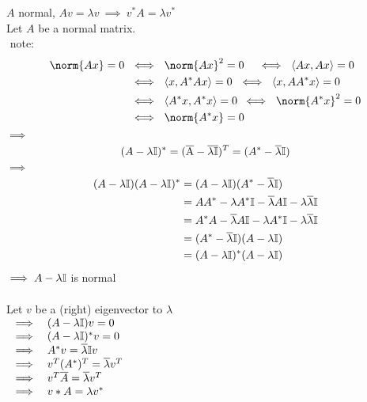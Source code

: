 \begin{SolutionSheet}[\ref{sheet2}]
\begin{onehalfspace}
  \begin{Solution}
    \Claim $A$ normal, $Av = \lambda v \ 
      \implies \ v^* A = \lambda v^*$ \\
    \Proof Let $A$ be a normal matrix. \\
    $ $ note: \begin{equation*}
      \begin{split}
        \norm{Ax} = 0 \ &\iff \ \norm{Ax}^2 = 0 \quad 
          \iff \ \langle Ax,Ax \rangle = 0 \\
          &\iff \ \langle x, A^*Ax \rangle = 0 \ 
          \iff \ \langle x, AA^*x \rangle = 0 \\
          &\iff \  \langle A^*x,A^*x\rangle = 0 \: 
          \iff \ \norm{A^*x}^2 = 0 \\
          &\iff \ \norm{A^*x} = 0
      \end{split}
    \end{equation*}
    $\implies$ \begin{equation*}
      (A - \lambda \mathbb{I})^* 
        = (\overline{\rm A} - \overline{\rm \lambda \mathbb{I}})^T 
        = (A^* - \overline{\lambda} \mathbb{I}) 
    \end{equation*}
    $ \implies$ \begin{align*} 
      (A - \lambda \mathbb{I})(A - \lambda \mathbb{I})^* &= (A - \lambda \mathbb{I})(A^* - \overline{\lambda} \mathbb{I}) \\
      &= AA^* - \lambda A^*\mathbb{I} - \overline{\lambda} A \mathbb{I} - \lambda \overline{\lambda} \mathbb{I} \\
      &= A^*A - \overline{\lambda} A \mathbb{I} - \lambda A^*\mathbb{I} - \lambda \overline{\lambda} \mathbb{I} \\
      &= (A^* - \overline{\lambda} \mathbb{I})(A - \lambda \mathbb{I}) \\
      &= (A - \lambda \mathbb{I})^* (A - \lambda \mathbb{I})
    \end{align*}
    $ \implies A - \lambda \mathbb{I}$ is normal\\
    \\
    Let $v$ be a (right) eigenvector to $\lambda$ \\
    $\begin{array}{ll}      
      \implies &(A- \lambda \mathbb{I})v = 0 \\
      \implies &(A- \lambda \mathbb{I})^*v = 0 \\
      \implies &A^*v = \overline{\lambda} \mathbb{I} v \\
      \implies &v^T(A^*)^T = \overline{\lambda} v^T \\
      \implies &v^T \overline{A} = \overline{\lambda} v^T \\
      \implies &v*A = \lambda v^*
    \end{array}$


\end{Solution}
\end{onehalfspace}
\end{SolutionSheet}
